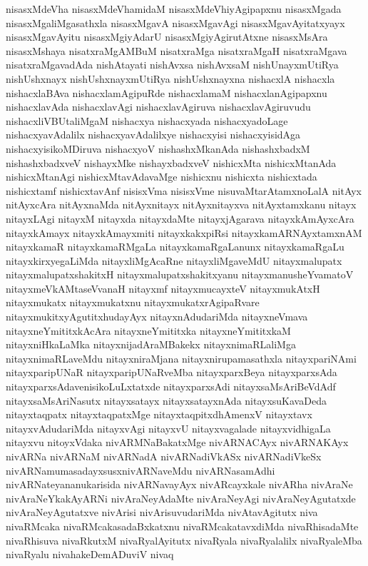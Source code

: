 {nisasxMdeVha
nisasxMdeVhamidaM
nisasxMdeVhiyAgipapxnu
nisasxMgada
nisasxMgaliMgasathxla
nisasxMgavA
nisasxMgavAgi
nisasxMgavAyitatxyayx
nisasxMgavAyitu
nisasxMgiyAdarU
nisasxMgiyAgirutAtxne
nisasxMsAra
nisasxMshaya
nisatxraMgAMBuM
nisatxraMga
nisatxraMgaH
nisatxraMgava
nisatxraMgavadAda
nishAtayati
nishAvxsa
nishAvxsaM
nishUnayxmUtiRya
nishUshxnayx
nishUshxnayxmUtiRya
nishUshxnayxna
nishacxlA
nishacxla
nishacxlaBAva
nishacxlamAgipuRde
nishacxlamaM
nishacxlanAgipapxnu
nishacxlavAda
nishacxlavAgi
nishacxlavAgiruva
nishacxlavAgiruvudu
nishacxliVBUtaliMgaM
nishacxya
nishacxyada
nishacxyadoLage
nishacxyavAdalilx
nishacxyavAdalilxye
nishacxyisi
nishacxyisidAga
nishacxyisikoMDiruva
nishacxyoV
nishashxMkanAda
nishashxbadxM
nishashxbadxveV
nishayxMke
nishayxbadxveV
nishicxMta
nishicxMtanAda
nishicxMtanAgi
nishicxMtavAdavaMge
nishicxnu
nishicxta
nishicxtada
nishicxtamf
nishicxtavAnf
nisisxVma
nisisxVme
nisuvaMtarAtamxnoLalA
nitAyx
nitAyxcAra
nitAyxnaMda
nitAyxnitayx
nitAyxnitayxva
nitAyxtamxkanu
nitayx
nitayxLAgi
nitayxM
nitayxda
nitayxdaMte
nitayxjAgarava
nitayxkAmAyxcAra
nitayxkAmayx
nitayxkAmayxmiti
nitayxkakxpiRsi
nitayxkamARNAyxtamxnAM
nitayxkamaR
nitayxkamaRMgaLa
nitayxkamaRgaLanunx
nitayxkamaRgaLu
nitayxkirxyegaLiMda
nitayxliMgAcaRne
nitayxliMgaveMdU
nitayxmalupatx
nitayxmalupatxshakitxH
nitayxmalupatxshakitxyanu
nitayxmanusheYvamatoV
nitayxmeVkAMtaseVvanaH
nitayxmf
nitayxmucayxteV
nitayxmukAtxH
nitayxmukatx
nitayxmukatxnu
nitayxmukatxrAgipaRvare
nitayxmukitxyAgutitxhudayAyx
nitayxnAdudariMda
nitayxneVmava
nitayxneYmititxkAcAra
nitayxneYmititxka
nitayxneYmititxkaM
nitayxniHkaLaMka
nitayxnijadAraMBakekx
nitayxnimaRLaliMga
nitayxnimaRLaveMdu
nitayxniraMjana
nitayxnirupamasathxla
nitayxpariNAmi
nitayxparipUNaR
nitayxparipUNaRveMba
nitayxparxBeya
nitayxparxsAda
nitayxparxsAdavenisikoLuLxtatxde
nitayxparxsAdi
nitayxsaMsAriBeVdAdf
nitayxsaMsAriNasutx
nitayxsatayx
nitayxsatayxnAda
nitayxsuKavaDeda
nitayxtaqpatx
nitayxtaqpatxMge
nitayxtaqpitxdhAmenxV
nitayxtavx
nitayxvAdudariMda
nitayxvAgi
nitayxvU
nitayxvagalade
nitayxvidhigaLa
nitayxvu
nitoyxVdaka
nivARMNaBakatxMge
nivARNACAyx
nivARNAKAyx
nivARNa
nivARNaM
nivARNadA
nivARNadiVkASx
nivARNadiVkeSx
nivARNamumasadayxsusxnivARNaveMdu
nivARNasamAdhi
nivARNateyananukarisida
nivARNavayAyx
nivARcayxkale
nivARha
nivAraNe
nivAraNeYkakAyARNi
nivAraNeyAdaMte
nivAraNeyAgi
nivAraNeyAgutatxde
nivAraNeyAgutatxve
nivArisi
nivArisuvudariMda
nivAtavAgitutx
niva
nivaRMcaka
nivaRMcakasadaBxkatxnu
nivaRMcakatavxdiMda
nivaRhisadaMte
nivaRhisuva
nivaRkutxM
nivaRyalAyitutx
nivaRyala
nivaRyalalilx
nivaRyaleMba
nivaRyalu
nivahakeDemADuviV
nivaq
}
